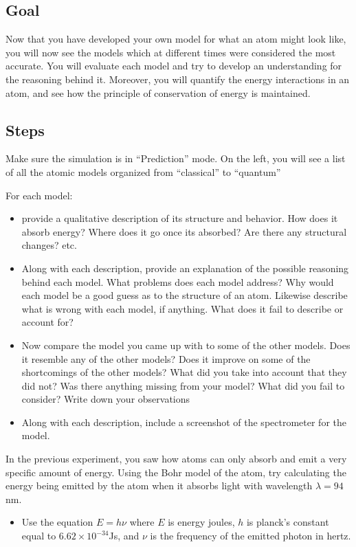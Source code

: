 \subsection{Goal} 
Now that you have developed your own model for what an atom might look like, you will now see the models which at different times were considered the most accurate. You will evaluate each model and try to develop an understanding for the reasoning behind it. Moreover, you will quantify the energy interactions in an atom, and see how the principle of conservation of energy is maintained. 

\subsection{Steps}

\begin{steps}
	\item Make sure the simulation is in ``Prediction'' mode. On the left, you will see a list of all the atomic models organized from ``classical'' to ``quantum''
	
	\item For each model:
	\begin{itemize}
		\item provide a qualitative description of its structure and behavior. How does it absorb energy? Where does it go once its absorbed? Are there any structural changes? etc. 
	
		\item Along with each description, provide an explanation of the possible reasoning behind each model. What problems does each model address? Why would each model be a good guess as to the structure of an atom. Likewise describe what is wrong with each model, if anything. What does it fail to describe or account for?
	
		\item Now compare the model you came up with to some of the other models. Does it resemble any of the other models? Does it improve on some of the shortcomings of the other models? What did you take into account that they did not? Was there anything missing from your model? What did you fail to consider? Write down your observations
	
		\item Along with each description, include a screenshot of the spectrometer for the model. 
	\end{itemize}
	
	\item In the previous experiment, you saw how atoms can only absorb and emit a very specific amount of energy. Using the Bohr model of the atom, try calculating the energy being emitted by the atom when it absorbs light with wavelength $\lambda = 94$nm. 
	\begin{itemize}
		\item Use the equation $\mathit{E} = \mathit{h}\nu$ where $\mathit{E}$ is energy joules, $\mathit{h}$ is planck's constant equal to \newline $6.62 \times 10^{-34}$Js, and $\nu$ is the frequency of the emitted photon in hertz.
		

\end{itemize}
\end{steps}
